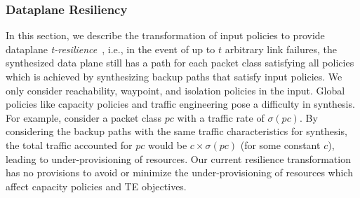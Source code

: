 

\subsubsection{Dataplane Resiliency}
\label{sec:resiliency}


In this section, we describe the transformation of input policies to
provide dataplane \emph{t-resilience}~\cite{plinko}, i.e., in the event of
up to $t$ arbitrary link failures, the synthesized data plane still has
a path for each packet class satisfying all policies which is achieved
by synthesizing backup paths that satisfy input policies.  We only
consider reachability, waypoint, and isolation policies in the input.
Global policies like capacity policies and traffic engineering pose a
difficulty in synthesis. For example, consider a packet class $pc$
with a traffic rate of $\sigma(pc)$. By considering the backup paths
with the same traffic characteristics for synthesis, the total traffic
accounted for $pc$ would be $c\times \sigma(pc)$ (for some constant
$c$), leading to under-provisioning of resources. Our current
resilience transformation has no provisions to avoid or minimize the
under-provisioning of resources which affect capacity policies and TE
objectives.

